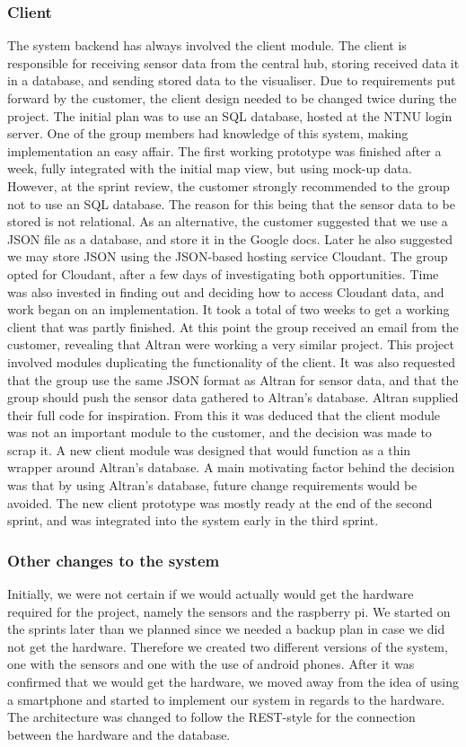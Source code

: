 \documentclass[../document.tex]{subfiles}
\begin{document}
\subsubsection{Client}
The system backend has always involved the client module. The client is responsible for receiving sensor data from the central hub, storing received data it in a database, and sending stored data to the visualiser. Due to requirements put forward by the customer, the client design needed to be changed twice during the project. The initial plan was to use an SQL database, hosted at the NTNU login server. One of the group members had knowledge of this system, making implementation an easy affair. The first working prototype was finished after a week, fully integrated with the initial map view, but using mock-up data. However, at the sprint review, the customer strongly recommended to the group not to use an SQL database. The reason for this being that the sensor data to be stored is not relational. As an alternative, the customer suggested that we use a JSON file as a database, and store it in the Google docs. Later he also suggested we may store JSON using the JSON-based hosting service Cloudant. The group opted for Cloudant, after a few days of investigating both opportunities. Time was also invested in finding out and deciding how to access Cloudant data, and work began on an implementation. It took a total of two weeks to get a working client that was partly finished. At this point the group received an email from the customer, revealing that Altran were working a very similar project. This project involved modules duplicating the functionality of the client. It was also requested that the group use the same JSON format as Altran for sensor data, and that the group should push the sensor data gathered to Altran’s database. Altran supplied their full code for inspiration. From this it was deduced that the client module was not an important module to the customer, and the decision was made to scrap it. A new client module was designed that would function as a thin wrapper around Altran’s database. A main motivating factor behind the decision was that by using Altran’s database, future change requirements would be avoided. The new client prototype was mostly ready at the end of the second sprint, and was integrated into the system early in the third sprint.

\subsubsection{Other changes to the system}
Initially, we were not certain if we would actually would get the hardware required for the project, namely the sensors and the raspberry pi. We started on the sprints later than we planned since we needed a backup plan in case we did not get the hardware. Therefore we created two different versions of the system, one with the sensors and one with the use of android phones. After it was confirmed that we would get the hardware, we moved away from the idea of using a smartphone and started to implement our system in regards to the hardware. The architecture was changed to follow the REST-style for the connection between the hardware and the database. 
\end{document}
